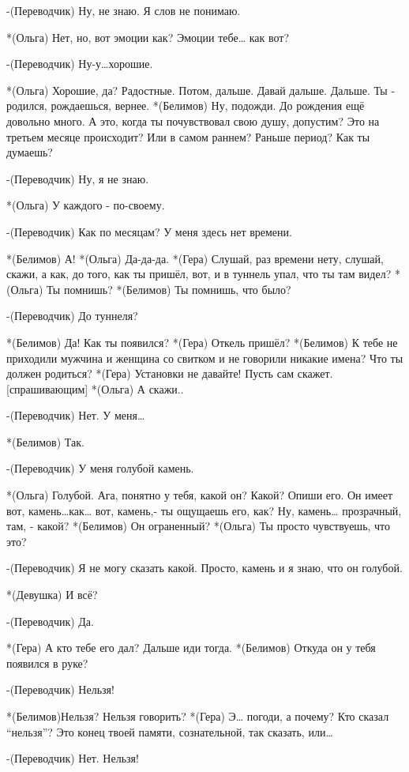-(Переводчик) Ну, не знаю. Я слов не понимаю.

*(Ольга) Нет, но, вот эмоции как? Эмоции тебе… как вот?

-(Переводчик) Ну-у…хорошие.

*(Ольга) Хорошие, да? Радостные. Потом, дальше. Давай дальше. Дальше. Ты - родился, рождаешься, вернее.
*(Белимов) Ну, подожди. До рождения ещё довольно много. А это, когда ты почувствовал свою душу, допустим? Это на третьем месяце происходит? Или в самом раннем?  Раньше период? Как ты думаешь?

-(Переводчик) Ну, я не знаю.

*(Ольга) У каждого -  по-своему.

-(Переводчик) Как по месяцам? У меня здесь нет времени.

*(Белимов) А!
*(Ольга) Да-да-да.
*(Гера) Слушай, раз времени нету, слушай, скажи, а как, до того, как ты пришёл, вот,  и в туннель упал, что ты там видел?
*(Ольга) Ты помнишь?
*(Белимов) Ты помнишь, что было?

-(Переводчик) До туннеля?

*(Белимов) Да! Как ты появился?
*(Гера) Откель пришёл?
*(Белимов) К тебе не приходили мужчина и женщина со свитком и не говорили никакие имена? Что ты должен родиться?
*(Гера) Установки не давайте! Пусть сам скажет. [спрашивающим]
*(Ольга) А скажи..

-(Переводчик) Нет. У меня…

*(Белимов) Так.

-(Переводчик) У меня голубой камень.

*(Ольга) Голубой. Ага, понятно у тебя, какой он? Какой? Опиши его. Он имеет вот, камень…как… вот, камень,- ты ощущаешь его, как? Ну, камень… прозрачный, там, - какой? 
*(Белимов) Он ограненный?
*(Ольга) Ты просто чувствуешь, что это?

-(Переводчик) Я не могу сказать какой. Просто, камень и я знаю, что он голубой. 

*(Девушка) И всё?

-(Переводчик) Да.

*(Гера) А кто тебе его дал? Дальше иди тогда.
*(Белимов) Откуда он у тебя появился в руке?

-(Переводчик) Нельзя!

*(Белимов)Нельзя? Нельзя говорить?
*(Гера) Э… погоди, а почему? Кто сказал “нельзя”? Это конец твоей памяти, сознательной, так сказать, или…

-(Переводчик) Нет. Нельзя!


